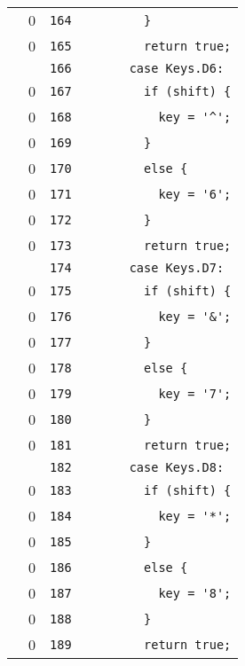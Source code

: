 \documentclass[a4paper,10pt]{article}
\begin{document}
\begin{longtable}[l]{lrrl}
\cellcolor{red} & 0 & \verb~164~ & \verb~        }~\\
\cellcolor{red} & 0 & \verb~165~ & \verb~        return true;~\\
\cellcolor{gray} &  & \verb~166~ & \verb~      case Keys.D6:~\\
\cellcolor{red} & 0 & \verb~167~ & \verb~        if (shift) {~\\
\cellcolor{red} & 0 & \verb~168~ & \verb~          key = '^';~\\
\cellcolor{red} & 0 & \verb~169~ & \verb~        }~\\
\cellcolor{red} & 0 & \verb~170~ & \verb~        else {~\\
\cellcolor{red} & 0 & \verb~171~ & \verb~          key = '6';~\\
\cellcolor{red} & 0 & \verb~172~ & \verb~        }~\\
\cellcolor{red} & 0 & \verb~173~ & \verb~        return true;~\\
\cellcolor{gray} &  & \verb~174~ & \verb~      case Keys.D7:~\\
\cellcolor{red} & 0 & \verb~175~ & \verb~        if (shift) {~\\
\cellcolor{red} & 0 & \verb~176~ & \verb~          key = '&';~\\
\cellcolor{red} & 0 & \verb~177~ & \verb~        }~\\
\cellcolor{red} & 0 & \verb~178~ & \verb~        else {~\\
\cellcolor{red} & 0 & \verb~179~ & \verb~          key = '7';~\\
\cellcolor{red} & 0 & \verb~180~ & \verb~        }~\\
\cellcolor{red} & 0 & \verb~181~ & \verb~        return true;~\\
\cellcolor{gray} &  & \verb~182~ & \verb~      case Keys.D8:~\\
\cellcolor{red} & 0 & \verb~183~ & \verb~        if (shift) {~\\
\cellcolor{red} & 0 & \verb~184~ & \verb~          key = '*';~\\
\cellcolor{red} & 0 & \verb~185~ & \verb~        }~\\
\cellcolor{red} & 0 & \verb~186~ & \verb~        else {~\\
\cellcolor{red} & 0 & \verb~187~ & \verb~          key = '8';~\\
\cellcolor{red} & 0 & \verb~188~ & \verb~        }~\\
\cellcolor{red} & 0 & \verb~189~ & \verb~        return true;~\\

\end{longtable}
\end{document}
